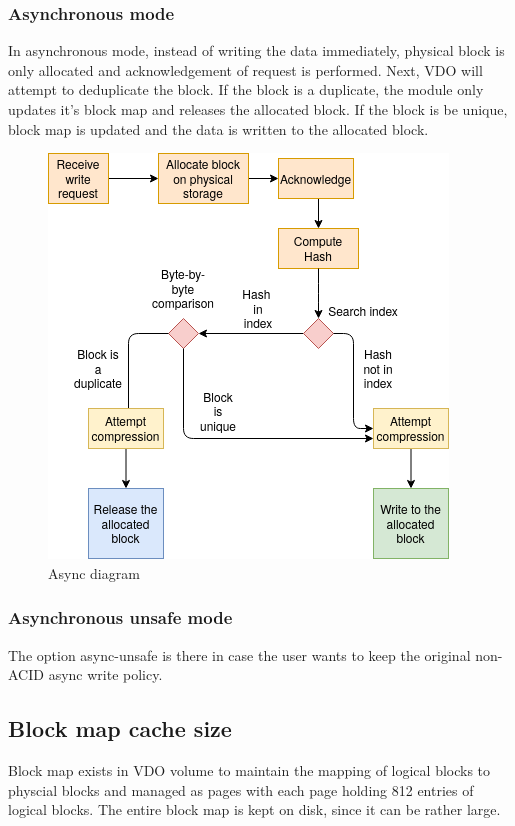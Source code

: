 \documentclass[
  color, %
  table, %
  lof,   %
  lot,   %
]{fithesis3}
\begin{document}
\subsubsection{Asynchronous mode}
In asynchronous mode, instead of writing the data immediately, physical block is only allocated and acknowledgement of request is performed. Next, VDO will attempt to deduplicate the block. If the block is a duplicate, the module only updates it's block map and releases the allocated block. If the block is be unique, block map is updated and the data is written to the allocated block.

\begin{figure}[!htb]
        \centering
        \includegraphics[width=\textwidth]{graphics/diagrams/async.png}
\caption[Async]{Async diagram}
\label{fig:async}
\end{figure}

\subsubsection{Asynchronous unsafe mode}
The option async-unsafe is there in case the user wants to keep the original non-ACID async write policy.


\subsection{Block map cache size}
Block map exists in VDO volume to maintain the mapping of logical blocks to physcial blocks and managed as pages with each page holding 812 entries of logical blocks. The entire block map is kept on disk, since it can be rather large.
\end{document}
